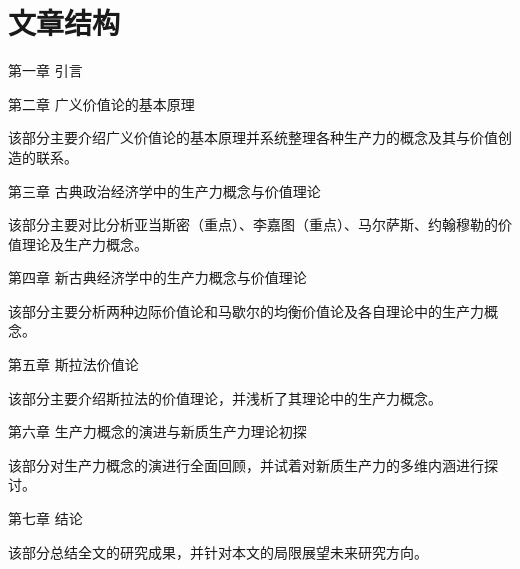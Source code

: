 \section{文章结构}
第一章 \quad 引言

第二章 \quad 广义价值论的基本原理

该部分主要介绍广义价值论的基本原理并系统整理各种生产力的概念及其与价值创造的联系。

第三章 \quad 古典政治经济学中的生产力概念与价值理论

该部分主要对比分析亚当斯密（重点）、李嘉图（重点）、马尔萨斯、约翰穆勒的价值理论及生产力概念。

第四章 \quad 新古典经济学中的生产力概念与价值理论

该部分主要分析两种边际价值论和马歇尔的均衡价值论及各自理论中的生产力概念。

第五章 \quad 斯拉法价值论

该部分主要介绍斯拉法的价值理论，并浅析了其理论中的生产力概念。

第六章 \quad 生产力概念的演进与新质生产力理论初探

该部分对生产力概念的演进行全面回顾，并试着对新质生产力的多维内涵进行探讨。

第七章 \quad 结论

该部分总结全文的研究成果，并针对本文的局限展望未来研究方向。


